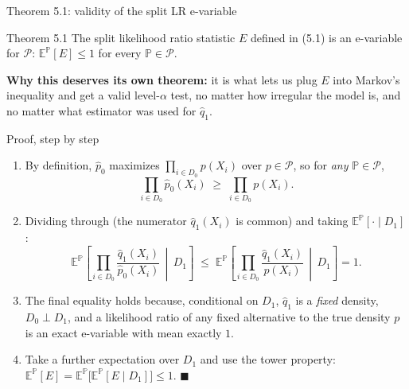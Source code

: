 \documentclass[aspectratio=169,10pt]{beamer}
\renewcommand{\P}{\mathbb{P}}
\newcommand{\E}{\mathbb{E}}
\newcommand{\calP}{\mathcal{P}}
\begin{document}
\begin{frame}[allowframebreaks]{Theorem 5.1: validity of the split LR e-variable}

  \begin{alertblock}{Theorem 5.1}
    The split likelihood ratio statistic $E$ defined in (5.1) is an
    e-variable for $\calP$: $\E^\P[E] \le 1$ for every $\P \in \calP$.
  \end{alertblock}

  \textbf{Why this deserves its own theorem:} it is what lets us plug
  $E$ into Markov's inequality and get a valid level-$\alpha$ test, no
  matter how irregular the model is, and no matter what estimator was
  used for $\hat q_1$.

  \begin{block}{Proof, step by step}
    \begin{enumerate}
      \item By definition, $\hat p_0$ maximizes $\prod_{i\in D_0} p(X_i)$
        over $p\in\calP$, so for \emph{any} $\P \in \calP$,
        $$ \prod_{i \in D_0} \hat p_0(X_i) \;\ge\; \prod_{i \in D_0} p(X_i). $$
      \item Dividing through (the numerator $\hat q_1(X_i)$ is common)
        and taking $\E^\P[\cdot \mid D_1]$:
        $$ \E^\P\!\left[\prod_{i\in D_0}\frac{\hat q_1(X_i)}{\hat p_0(X_i)} \,\middle|\, D_1\right]
           \;\le\; \E^\P\!\left[\prod_{i\in D_0}\frac{\hat q_1(X_i)}{p(X_i)} \,\middle|\, D_1\right] = 1. $$
      \item The final equality holds because, conditional on $D_1$,
        $\hat q_1$ is a \emph{fixed} density, $D_0 \perp D_1$, and a
        likelihood ratio of any fixed alternative to the true density
        $p$ is an exact e-variable with mean exactly $1$.
      \item Take a further expectation over $D_1$ and use the tower
        property: $\E^\P[E] = \E^\P\big[\E^\P[E\mid D_1]\big] \le 1$.
        $\blacksquare$
    \end{enumerate}
  \end{block}

\end{frame}
\end{document}
